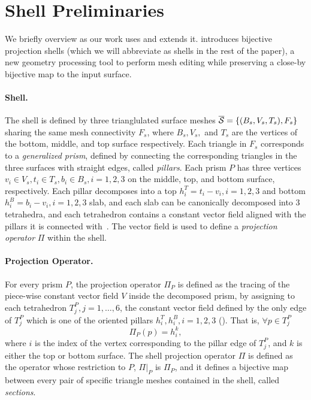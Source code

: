 \section{Shell Preliminaries}

We briefly overview \cite{jiang2020bijective} as our work uses and extends it. \cite{jiang2020bijective} introduces bijective projection shells (which we will abbreviate as shells in the rest of the paper), a new geometry processing tool to perform mesh editing while preserving a close-by bijective map to the input surface. 

\paragraph{Shell.} The shell is defined by three trianglulated surface meshes $\overline{\mathcal{S}} = \{(B_s,V_s,T_s),F_s\}$ sharing the same mesh connectivity $F_s$, where $B_s, V_s,$ and $T_s$ are the vertices of the bottom, middle, and top surface respectively. 
Each triangle in $F_s$ corresponds to a \emph{generalized prism}, defined by connecting the corresponding triangles in the three surfaces with straight edges, called \emph{pillars}. 
Each prism $P$ has three vertices $v_i\in V_s, t_i\in T_s, b_i\in B_s, i=1,2,3$ on the middle, top, and bottom surface, respectively. 
Each pillar decomposes into a top $h_i^T = t_i - v_i, i=1,2,3$ and bottom $h_i^B = b_i - v_i, i=1,2,3$ {slab}, and each {slab} can be canonically decomposed into 3 tetrahedra, and each tetrahedron contains a constant vector field aligned with the pillars it is connected with{~\cite[Figure 4]{jiang2020bijective}}. The vector field is used to define a \emph{projection operator} $\Pi$ within the shell. 

\paragraph{Projection Operator.} For every prism $P$, the projection operator $\Pi_P$ is defined as the tracing of the piece-wise constant vector field $V$ inside the decomposed prism, by assigning to each tetrahedron $T^P_j, j = 1, \dots, 6$, the constant vector field defined by the only edge of $T^P_j$ which {is} one of the oriented pillars $h_i^T, h_i^B, i=1,2,3$ ({\cite[Figure 4]{jiang2020bijective}}). That is, $\forall p \in T^P_j$
\[
\Pi_P(p)=h_i^k, 
\]
where $i$ is the index of the vertex corresponding to the pillar edge of $T^P_j$, and $k$ is either the top or bottom surface. The shell projection operator $\Pi$ is defined as the operator whose restriction to $P$, $\Pi|_P$ is $\Pi_P$, and it defines a bijective map between every pair of specific triangle meshes contained in the shell, called \emph{sections}.

